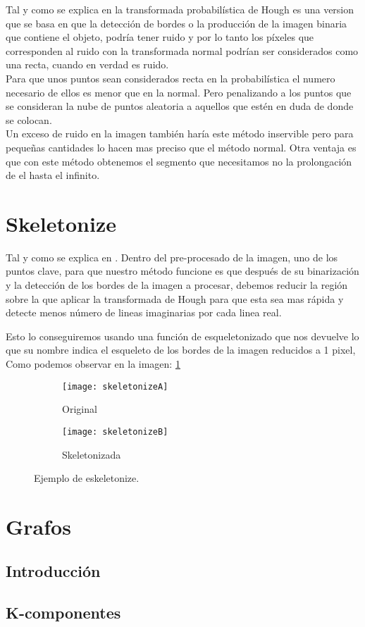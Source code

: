 Tal y como se explica en \cite{Kiryati20001157} la transformada probabilística de Hough es una version que se basa en que la detección de bordes o la producción de la imagen binaria que contiene el objeto, podría tener ruido y por lo tanto los píxeles que corresponden al ruido con la transformada normal podrían ser considerados como una recta, cuando en verdad es ruido.\\
Para que unos puntos sean considerados recta en la probabilística el numero necesario de ellos es menor que en la normal. Pero penalizando a los puntos que se consideran la nube de puntos aleatoria a aquellos que estén en duda de donde se colocan.\\
Un exceso de ruido en la imagen también haría este método inservible pero para pequeñas cantidades lo hacen mas preciso que el método normal.
Otra ventaja es que con este método obtenemos el segmento que necesitamos no la prolongación de el hasta el infinito.

\section{Skeletonize }
Tal y como se explica en \cite{scik:skeleton}. Dentro del pre-procesado de la imagen, uno de los puntos clave, para que nuestro método funcione es que después de su binarización y la detección de los bordes de la imagen a procesar, debemos reducir la región sobre la que aplicar la transformada de Hough para que esta sea mas rápida y detecte menos número de lineas imaginarias por cada linea real.

Esto lo conseguiremos usando una función de esqueletonizado que nos devuelve lo que su nombre indica el esqueleto de los bordes de la imagen reducidos a 1 pixel, Como podemos observar en la imagen: \ref{fig:3.6}


\begin{figure}
\begin{subfigure}[b]{.5\linewidth}
\centering\large \texttt{[image: skeletonizeA]}
\caption{Original}
\end{subfigure}%
\begin{subfigure}[b]{.5\linewidth}
\centering\large \texttt{[image: skeletonizeB]}
\caption{Skeletonizada}
\end{subfigure}
\caption{Ejemplo de eskeletonize.}\label{fig:3.6}
\end{figure}


\section{Grafos}
	
\subsection{Introducción}
\subsection{K-componentes}